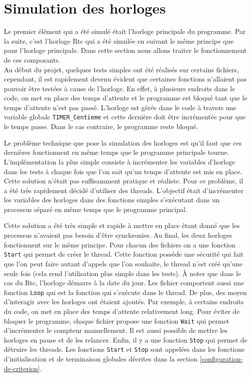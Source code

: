 \documentclass[a4paper]{article}
\begin{document}
\section{Simulation des horloges}%
\label{simuhorologes}

Le premier élément qui a été simulé était l'horloge principale du programme. Par
la suite, c'est l'horloge Rtc qui a été simulée en suivant le même principe que
pour l'horloge principale. Dans cette section nous allons traiter le
fonctionnement de ces composants.\\

Au début du projet, quelques tests simples ont été réalisés sur certains
fichiers, cependant, il est rapidement devenu évident que certaines fonctions
n'allaient pas pouvoir être testées à cause de l'horloge. En effet, à plusieurs
endroits dans le code, on met en place des temps d'attente et le programme est
bloqué tant que le temps d'attente n'est pas passé. L'horloge est gérée dans le
code à travers une variable globale \verb|TIMER_Centieme| et cette dernière
doit être incrémentée pour que le temps passe. Dans le cas contraire, le
programme reste bloqué.

Le problème technique que pose la simulation des horloges est qu'il faut que ces
dernières fonctionnent en même temps que le programme principale tourne.
L'implémentation la plus simple consiste à incrémenter les variables d'horloge
dans les tests à chaque fois que l'on sait qu'un temps d'attente est mis en
place. Cette solution n'était pas suffisamment pratique et réaliste. Pour ce
problème, il a été très rapidement décidé d'utiliser des threads. L'objectif
était d'incrémenter les variables des horloges dans des fonctions simples
s'exécutant dans un processus séparé en même temps que le programme principal.

Cette solution a été très simple et rapide à mettre en place étant donné que les
processus n'avaient pas besoin d'être synchronies. Au final, les deux horloges
fonctionnent sur le même principe. Pour chacun des fichiers on a une fonction
\verb|Start| qui permet de créer le thread. Cette fonction possède une
sécurité qui fait que l'on peut faire autant d'appels que l'on souhaite, le
thread n'est créé qu'une seule fois (cela rend l'utilisation plus simple dans
les tests). À noter que dans le cas du Rtc, l'horloge démarre à la date du jour.
Les fichier comportent aussi une fonction \verb|Loop| qui est la fonction
qui s'exécute dans le thread. De plus, des moyen d'interagir avec les horloges
ont étaient ajoutés. Par exemple, à certains endroits du code, on met en place
des temps d'attente relativement long. Pour éviter de bloquer le programme,
chaque fichier propose une fonction \verb|Wait| qui permet d'incrémenter le
compteur manuellement. Il est aussi possible de mettre les horloges en pause et
de les relancer. Enfin, il y a une fonction \verb|Stop| qui permet de
détruire les threads. Les fonctions \verb|Start| et \verb|Stop| sont
appelées dans les fonctions d'initialisation et de terminaison globales décrites
dans la section \ref{configuration-de-criterion}.\\
\end{document}
